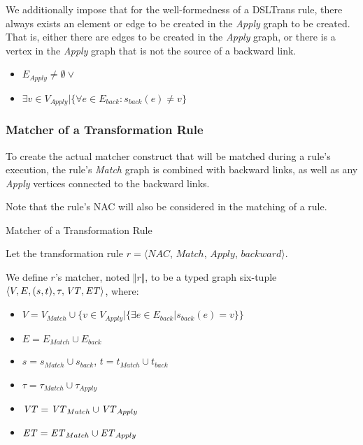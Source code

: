 We additionally impose that for the well-formedness of a DSLTrans rule, there always exists an element or edge to be created in the \textit{Apply} graph to be created. That is, either there are edges to be created in the \textit{Apply} graph, or there is a vertex in the \textit{Apply} graph that is not the source of a backward link.

\begin{itemize}
\item $E_{\textit{Apply}} \neq \emptyset \lor$
\item $ \exists v \in V_{\textit{Apply}} | \big\{\forall e \in E_{back}: s_{back}(e) \neq v \big\}$
\end{itemize}


\subsubsection*{Matcher of a Transformation Rule}

To create the actual matcher construct that will be matched during a rule's execution, the rule's \textit{Match} graph is combined with backward links, as well as any \textit{Apply} vertices connected to the backward links.

Note that the rule's NAC will also be considered in the matching of a rule.

\begin{definition}{Matcher of a Transformation Rule\\}
\label{def:back_match_transformation_rule}

Let the transformation rule $r = \big\langle \mathit{NAC}$, $\mathit{Match}$, $\mathit{Apply}$, $\mathit{backward}\big\rangle$.

We define $r$'s matcher, noted $\Vert r \Vert$, to be a typed graph six-tuple $\langle V,E,(s,t),\tau, \mathit{VT}, \mathit{ET}\rangle$, where:
\begin{itemize}
\item $V = V_{Match} \cup \big\{v \in V_{Apply} | \{\exists e \in E_{back} | s_{back}(e) = v\}\big\}$
\item $E = E_{Match} \cup E_{back}$
\item $s = s_{Match} \cup s_{back}$, $t = t_{Match} \cup t_{back}$
\item $\tau = \tau_{Match} \cup \tau_{Apply}$
\item $\mathit{VT} = \mathit{VT}_{Match} \cup \mathit{VT}_{Apply}$
\item $\mathit{ET} = \mathit{ET}_{Match} \cup \mathit{ET}_{Apply}$
\end{itemize}

\end{definition}

